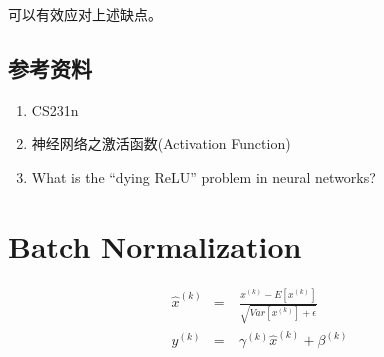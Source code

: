 \documentclass[letterpaper,10pt,english]{sphinxmanual}
\begin{document}
 可以有效应对上述缺点。


\subsection{参考资料}
\label{\detokenize{deepLearning/02_activationFunction:id2}}\begin{enumerate}
\item {} 
CS231n

\end{enumerate}
\begin{quote}

\end{quote}
\begin{enumerate}
\setcounter{enumi}{1}
\item {} 
神经网络之激活函数(Activation Function)

\end{enumerate}
\begin{quote}

\end{quote}
\begin{enumerate}
\setcounter{enumi}{2}
\item {} 
What is the “dying ReLU” problem in neural networks?

\end{enumerate}
\begin{quote}

\end{quote}


\section{Batch Normalization}
\label{\detokenize{deepLearning/03_batchnorm:batch-normalization}}\label{\detokenize{deepLearning/03_batchnorm::doc}}\begin{equation*}
\begin{split}\hat{x}^{(k)} &=&\ \frac{x^{(k)} - E[x^{(k)}]}{\sqrt{Var[x^{{(k)}}] + \epsilon}} \\
y^{(k)} &=&\ \gamma^{(k)} \hat{x}^{(k)} + \beta^{(k)}\end{split}
\end{equation*}
\end{document}
